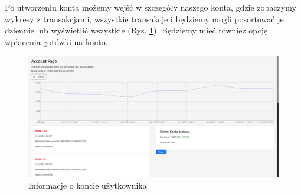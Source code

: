 Po utworzeniu konta możemy wejść w szczegóły naszego konta, gdzie zobaczymy wykresy z transakcjami, wszystkie transakcje i będziemy mogli posortować je dziennie lub wyświetlić wszystkie  (Rys. \ref{fig:accountpage}). Będziemy mieć również opcję wpłacenia gotówki na konto.
\begin{figure}
	\centering
	\includegraphics[width=0.7\linewidth]{images/AccountPage}
	\caption{Informacje o koncie użytkownika}
	\label{fig:accountpage}
\end{figure}
